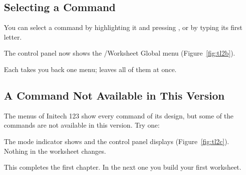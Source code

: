 \subsection{Selecting a Command}
You can select a command by highlighting it and pressing , or
by typing its first letter.

\begin{Keystrokes}
\end{Keystrokes}
The control panel now shows the /Worksheet Global menu
(Figure~\ref{fig:tl2b}).

\begin{Keystrokes}
\end{Keystrokes}
Each  takes you back one menu;  leaves all of
them at once.

\subsection{A Command Not Available in This Version}
The menus of Initech 123 show every command of its design, but some of the
commands are not available in this version.  Try one:

\begin{Keystrokes}
\end{Keystrokes}
The mode indicator shows  and the control panel displays
 (Figure~\ref{fig:tl2c}).  Nothing in the
worksheet changes.
\begin{Keystrokes}
\end{Keystrokes}
This completes the first chapter.  In the next one you build your first
worksheet.
